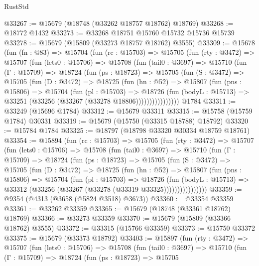 \begin{lexlean}{RustStd}
\begin{coremodule}
@33267 := @15679 (@18748 (@33262 @18757 @18762) @18769)
@33268 := @18772 @1432
@33273 := @33268 @18751 @15760 @15732 @15736 @15739
@33278 := @15679 (@15809 (@33273 @18757 @18762) @3555)
@33309 := @15678
    (fun (fn : @83) =>
    @15704
      (fun (rc : @15703) =>
      @15705
        (fun (rty : @3472) =>
        @15707
          (fun (lets0 : @15706) =>
          @15708
            (fun (tail0 : @3697) =>
            @15710
              (fun (Γ : @15709) =>
              @18724
                (fun (ps : @18723) =>
                @15705
                  (fun (S : @3472) =>
                  @15705
                    (fun (D : @3472) =>
                    @18725
                      (fun (hn : @52) =>
                      @15807
                        (fun (pns : @15806) =>
                        @15704
                          (fun (pl : @15703) =>
                          @18726
                            (fun (bodyL : @15713) =>
                            @33251 (@33256 (@33267 (@33278 @18806))))))))))))))))
    @1784
@33311 := @33249 (@15696 @1784)
@33312 := @15679 @33311
@33315 := @15758 (@15759 @1784) @30331
@33319 := @15679 (@15750 (@33315 @18788) @18792)
@33320 := @15784 @1784
@33325 := @18797 (@18798 @33320 @30334 @18759 @18761)
@33354 := @15894
    (fun (rc : @15703) =>
    @15705
      (fun (rty : @3472) =>
      @15707
        (fun (lets0 : @15706) =>
        @15708
          (fun (tail0 : @3697) =>
          @15710
            (fun (Γ : @15709) =>
            @18724
              (fun (ps : @18723) =>
              @15705
                (fun (S : @3472) =>
                @15705
                  (fun (D : @3472) =>
                  @18725
                    (fun (hn : @52) =>
                    @15807
                      (fun (pns : @15806) =>
                      @15704
                        (fun (pl : @15703) =>
                        @18726
                          (fun (bodyL : @15713) =>
                          @33312 (@33256 (@33267 (@33278 (@33319 @33325))))))))))))))))
@33359 := @9354 (@4313 (@3658 (@5824 @3518) @3673))
@33360 := @33354 @33359
@33361 := @33262 @33359
@33365 := @15679 (@18748 (@33361 @18762) @18769)
@33366 := @33273 @33359
@33370 := @15679 (@15809 (@33366 @18762) @3555)
@33372 := @33315 (@15766 @33359)
@33373 := @15750 @33372
@33375 := @15679 (@33373 @18792)
@33403 := @15897
    (fun (rty : @3472) =>
    @15707
      (fun (lets0 : @15706) =>
      @15708
        (fun (tail0 : @3697) =>
        @15710
          (fun (Γ : @15709) =>
          @18724
            (fun (ps : @18723) =>
            @15705

\end{coremodule}
\end{lexlean}
